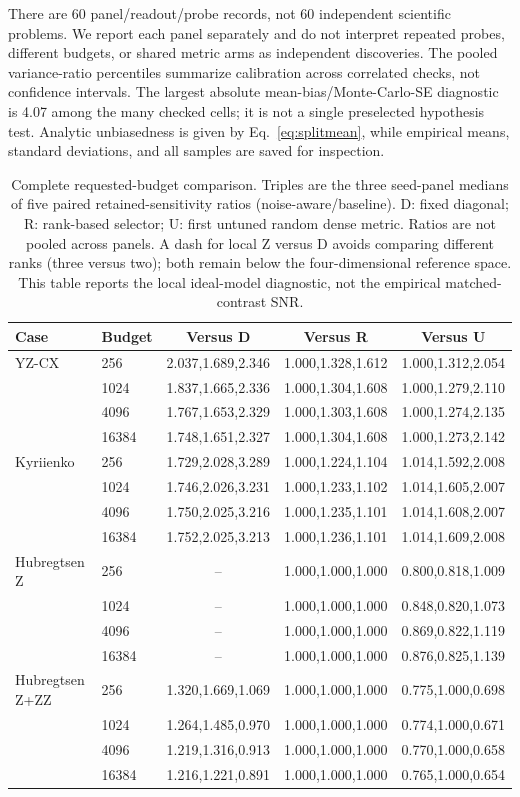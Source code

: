 There are 60 panel/readout/probe records, not 60 independent
scientific problems. We report each panel separately and do not
interpret repeated probes, different budgets, or shared metric arms
as independent discoveries. The pooled variance-ratio percentiles
summarize calibration across correlated checks, not confidence
intervals. The largest absolute mean-bias/Monte-Carlo-SE diagnostic
is 4.07 among the many checked cells; it is not a single preselected
hypothesis test. Analytic unbiasedness is given by
Eq.~\eqref{eq:splitmean}, while empirical means, standard deviations,
and all samples are saved for inspection.

\begin{table}[htbp]
\centering
\caption{Complete requested-budget comparison. Triples are the
three seed-panel medians of five paired retained-sensitivity ratios
(noise-aware/baseline). D: fixed diagonal; R: rank-based selector;
U: first untuned random dense metric. Ratios are not pooled across
panels. A dash for local Z versus D avoids comparing different
ranks (three versus two); both remain below the four-dimensional
reference space. This table reports the local ideal-model diagnostic,
not the empirical matched-contrast SNR.}
\label{tab:allshotbudgets}
\small
\begin{tabular}{llccc}
\toprule
Case & Budget & Versus D & Versus R & Versus U\\
\midrule
YZ-CX & 256 & 2.037,1.689,2.346 & 1.000,1.328,1.612 & 1.000,1.312,2.054\\
 & 1024 & 1.837,1.665,2.336 & 1.000,1.304,1.608 & 1.000,1.279,2.110\\
 & 4096 & 1.767,1.653,2.329 & 1.000,1.303,1.608 & 1.000,1.274,2.135\\
 & 16384 & 1.748,1.651,2.327 & 1.000,1.304,1.608 & 1.000,1.273,2.142\\[3pt]
Kyriienko & 256 & 1.729,2.028,3.289 & 1.000,1.224,1.104 & 1.014,1.592,2.008\\
 & 1024 & 1.746,2.026,3.231 & 1.000,1.233,1.102 & 1.014,1.605,2.007\\
 & 4096 & 1.750,2.025,3.216 & 1.000,1.235,1.101 & 1.014,1.608,2.007\\
 & 16384 & 1.752,2.025,3.213 & 1.000,1.236,1.101 & 1.014,1.609,2.008\\[3pt]
Hubregtsen Z & 256 & -- & 1.000,1.000,1.000 & 0.800,0.818,1.009\\
 & 1024 & -- & 1.000,1.000,1.000 & 0.848,0.820,1.073\\
 & 4096 & -- & 1.000,1.000,1.000 & 0.869,0.822,1.119\\
 & 16384 & -- & 1.000,1.000,1.000 & 0.876,0.825,1.139\\[3pt]
Hubregtsen Z+ZZ & 256 & 1.320,1.669,1.069 & 1.000,1.000,1.000 & 0.775,1.000,0.698\\
 & 1024 & 1.264,1.485,0.970 & 1.000,1.000,1.000 & 0.774,1.000,0.671\\
 & 4096 & 1.219,1.316,0.913 & 1.000,1.000,1.000 & 0.770,1.000,0.658\\
 & 16384 & 1.216,1.221,0.891 & 1.000,1.000,1.000 & 0.765,1.000,0.654\\
\bottomrule
\end{tabular}
\end{table}

